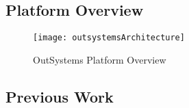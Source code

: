 \subsection{Platform Overview}
\label{subsec:platform_overview}

\begin{figure}[htbp]
	\centering
	\texttt{[image: outsystemsArchitecture]}
	\caption{OutSystems Platform Overview \cite{outsystemsToolsAndComponents}}
	\label{fig:outsystemsArchitecture}
\end{figure}

\subsection{Previous Work}
\label{subsec:previous_work}
